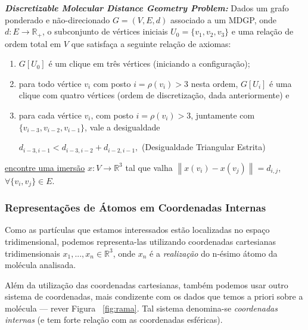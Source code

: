 \documentclass[a4paper,12pt]{article}
\begin{document}
 	\begin{center}
 		\begin{minipage}{0.9 \linewidth}
 			\textbf{\textit{Discretizable Molecular Distance Geometry Problem:}} Dados um grafo ponderado e não-direcionado $G = (V,E,d)$ associado a um MDGP, onde $d: E \longrightarrow \mathbb{R}_{+}$, o subconjunto de vértices iniciais $U_{0} = \{v_{1},v_{2},v_{3} \}$ e uma relação de ordem total em $V$ que satisfaça a seguinte relação de axiomas:
 			\begin{enumerate}
 				\vspace{-0.2cm}
 				\item $G[U_{0}]$ é um clique em três vértices (iniciando a configuração);
 				\vspace{-0.2cm}
 				\item para todo vértice $v_{i}$ com posto $i = \rho(v_{i}) > 3$ nesta ordem, $G[U_{i}]$ é uma clique com quatro vértices (ordem de discretização, dada anteriormente) e
 				\vspace{-0.2cm}
 				\item para cada vértice $v_{i}$, com posto $i = \rho(v_{i}) > 3$, juntamente com $\{ v_{i-3}, v_{i-2} , v_{i-1} \}$, vale a desigualdade
 				\vspace{-0.25cm}
 				\begin{center}
 					$d_{i-3,i-1} < d_{i-3,i-2} + d_{i-2,i-1},$ \hspace{0.5cm} (Desigualdade Triangular Estrita)
 				\end{center}
 			\end{enumerate}
 			\vspace{-0.2cm}
 			\underline{encontre uma imersão} $x: V \longrightarrow \mathbb{R}^{3}$ tal que valha $\left\| x(v_{i}) - x(v_{j}) \right\| = d_{i,j}$, $\forall \{v_{i},v_{j} \} \in E$.
 		\end{minipage}
 	\end{center}
 	
 	\subsubsection{Representações de Átomos em Coordenadas Internas\label{sec:bi}}
 	Como as partículas que estamos interessados estão localizadas no espaço tridimensional, podemos representa-las utilizando coordenadas cartesianas tridimensionais $x_1, ...,x_n \in\mathbb{R}^3$, onde $x_n$ é a \textit{realização} do n-ésimo átomo da molécula analisada. 
 	
 	Além da utilização das coordenadas cartesianas, também podemos usar outro sistema de coordenadas, mais condizente com os dados que temos a priori sobre a molécula --- rever Figura ~\ref{fig:rama}. Tal sistema denomina-se \textit{coordenadas internas} (e tem forte relação com as coordenadas esféricas).
 	
\end{document}
